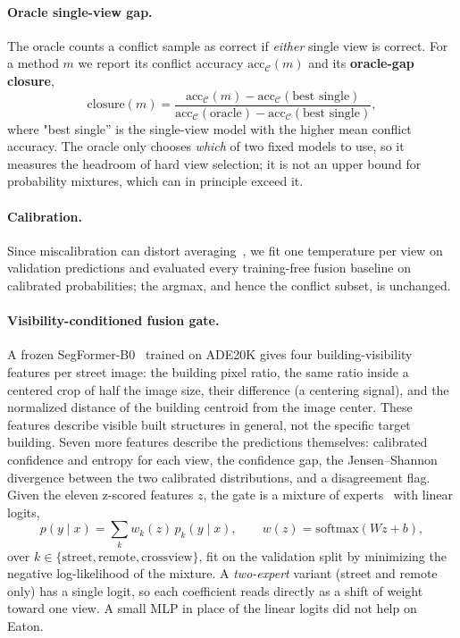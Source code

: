 \documentclass[sigconf]{acmart}
\newcommand{\conf}{\mathcal{C}}
\newcommand{\acc}{\mathrm{acc}}
\begin{document}
\paragraph{Oracle single-view gap.}
The oracle counts a conflict sample as correct if \emph{either} single view is
correct. For a method $m$ we report its conflict accuracy $\acc_{\conf}(m)$
and its \textbf{oracle-gap closure},
\begin{equation}
\mathrm{closure}(m)=
\frac{\acc_{\conf}(m)-\acc_{\conf}(\text{best single})}
     {\acc_{\conf}(\text{oracle})-\acc_{\conf}(\text{best single})},
\label{eq:closure}
\end{equation}
where "best single'' is the single-view model with the higher mean conflict
accuracy. The oracle only chooses \emph{which} of two fixed models to use,
so it measures the headroom of hard view selection; it is not an upper bound
for probability mixtures, which can in principle exceed it.

\paragraph{Calibration.}
Since miscalibration can distort averaging~\cite{guo2017calibration},
we fit one temperature per view on validation predictions and evaluated every
training-free fusion baseline on calibrated probabilities; the argmax, and
hence the conflict subset, is unchanged.

\paragraph{Visibility-conditioned fusion gate.}
A frozen SegFormer-B0~\cite{xie2021segformer} trained on ADE20K gives four
building-visibility features per street image: the building pixel ratio, the
same ratio inside a centered crop of half the image size, their difference (a
centering signal), and the normalized distance of the building centroid from
the image center. These features describe visible built structures in
general, not the specific target building. Seven more features describe the
predictions themselves: calibrated confidence and entropy for each view, the
confidence gap, the Jensen--Shannon divergence between the two calibrated
distributions, and a disagreement flag. Given the eleven z-scored features
$z$, the gate is a mixture of experts~\cite{jacobs1991adaptive} with linear
logits,
\begin{equation}
p(y\mid x)=\sum_{k}w_k(z)\,p_k(y\mid x),\qquad w(z)=\mathrm{softmax}(Wz+b),
\label{eq:gate}
\end{equation}
over $k\in\{\text{street},\text{remote},\text{crossview}\}$, fit on the
validation split by minimizing the negative log-likelihood of the mixture.
A \emph{two-expert} variant (street and remote only) has a single logit, so
each coefficient reads directly as a shift of weight toward one view. A small
MLP in place of the linear logits did not help on Eaton.
\end{document}
